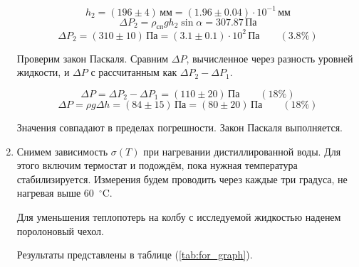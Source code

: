 \documentclass[a4paper,12pt]{article} %
\begin{document}
\begin{enumerate}
  \[
    h_2 = (196 \pm 4) \, \text{мм} = (1.96 \pm 0.04) \cdot 10^{-1} \, \text{мм}
  \]
  \[
    \Delta P_2 = \rho_\text{сп} g h_2 \sin{\alpha} = 307.87 \, \text{Па} 
  \]
  \[
    \Delta P_2 = (310 \pm 10) \, \text{Па} = (3.1 \pm 0.1) \cdot 10^{2} \, \text{Па} \qquad (3.8 \%)
  \]
  
  Проверим закон Паскаля. Сравним $\Delta P$, вычисленное через разность уровней жидкости, и $\Delta P$ с рассчитанным как $\Delta P_2 - \Delta P_1$.

  \[ 
    \Delta P = \Delta P_2 - \Delta P_1 = (110 \pm 20) \, \text{Па} \qquad (18 \%)
  \]
  \[ 
    \Delta P = \rho g \Delta h = (84 \pm 15) \, \text{Па} = (80 \pm 20) \, \text{Па} \qquad (18 \%)
  \]

  Значения совпадают в пределах погрешности. Закон Паскаля выполняется.
  
  \item Снимем зависимость $\sigma(T)$ при нагревании дистиллированной воды. Для этого включим термостат и подождём, пока нужная температура стабилизируется. Измерения будем проводить через каждые три градуса, не нагревая выше 60~$^{\circ}$C. 
  
  Для уменьшения теплопотерь на колбу с исследуемой жидкостью наденем поролоновый чехол.
  
  Результаты представлены в таблице (\ref{tab:for_graph}).


\end{enumerate}
\end{document}
